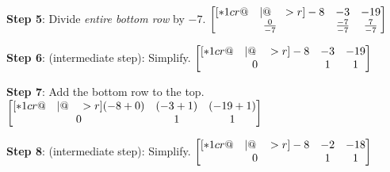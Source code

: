 \documentclass[12pt,tiks]{article}
\begin{document}
    \hspace{.1in}\vspace{.5in}
\newpage
\clearpage
\thispagestyle{fancy}
    \begin{minipage}[t][.7in][t]{3in}\RaggedRight
    \-\vspace*{.1in}
    \textbf{Step 5}: Divide \textit{entire bottom row} by $-7$.
        $
            \begin{bmatrix}[*1cr@{\quad}|@{\quad}>{\color{black}}r]
              -8 & -3 & -19 \\
              \frac{0}{-7} & \frac{-7}{-7} & \frac{7}{-7}
            \end{bmatrix}
        $
    \end{minipage}
    \hspace{.1in}
    \begin{minipage}[t][.7in][t]{3in}\RaggedRight
    \-\vspace*{.1in}
    \textbf{Step 6}: (intermediate step): Simplify.
     $
            \begin{bmatrix}[*1cr@{\quad}|@{\quad}>{\color{black}}r]
              -8 & -3 & -19 \\
              0 & 1 & 1
            \end{bmatrix}
        $
    \end{minipage}
    
    \hspace{.1in}\vspace{.5in}
    
    \begin{minipage}[t][.7in][t]{3in}\RaggedRight
    \-\vspace*{.1in}
    \textbf{Step 7}: Add the bottom row to the top.
        $
            \begin{bmatrix}[*1cr@{\quad}|@{\quad}>{\color{black}}r]
              ({-8+0}) & ({-3+1}) & ({-19+1}) \\
              0 & 1 & 1
            \end{bmatrix}
        $
    \end{minipage}
    \hspace{.1in}
    \begin{minipage}[t][.7in][t]{3in}\RaggedRight
    \-\vspace*{.1in}
    \textbf{Step 8}: (intermediate step): Simplify.
        $
            \begin{bmatrix}[*1cr@{\quad}|@{\quad}>{\color{black}}r]
              -8 & -2 & -18 \\
              0 & 1 & 1
            \end{bmatrix}
        $
    \end{minipage}
    
\end{document}
